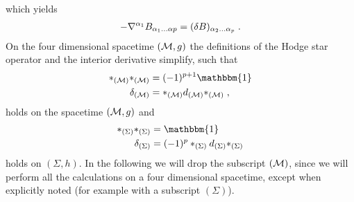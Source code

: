 which yields
\begin{align}
-\nabla^{\alpha_1}B_{\alpha_1 \dots \alpha p} = (\delta B)_{\alpha_2 \dots \alpha_p}\;.
\end{align}
On the four dimensional spacetime $(\mathcal{M},g)$ the definitions of the Hodge star operator and the interior derivative simplify, such that
\begin{align}
*_{(\M)}*_{(\M)} &= (-1)^{p+1} \mathbbm{1} \\
\delta_{(\M)} &= *_{(\M)}{d_{(\M)}*_{(\M)}} \formspace ,
\end{align}
holds on the spacetime $(\mathcal{M},g)$ and
\begin{align}
*_{(\Sigma)}*_{(\Sigma)} &= \mathbbm{1} \\
\delta_{(\Sigma)} &= (-1)^p *_{(\Sigma)}{d_{(\Sigma)}*_{(\Sigma)}}
\end{align}
holds on  $(\Sigma,h)$. In the following we will drop the subscript ${(\mathcal{M})}$, since we will perform all the calculations on a four dimensional spacetime, except when explicitly noted (for example with a subscript $(\Sigma)$).
%
%
%
%
%
%
%
%
